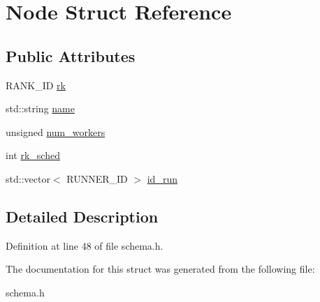 \hypertarget{structNode}{
\section{Node Struct Reference}
\label{structNode}
}
\subsection*{Public Attributes}
\begin{CompactItemize}
\item 
\hypertarget{structNode_7de6f254b6b8c3f9f8287af0bb742e9b}{
RANK\_\-ID \hyperlink{structNode_7de6f254b6b8c3f9f8287af0bb742e9b}{rk}}
\label{structNode_7de6f254b6b8c3f9f8287af0bb742e9b}

\item 
\hypertarget{structNode_3c4318d71ca9a44fe33edcf8b7f26863}{
std::string \hyperlink{structNode_3c4318d71ca9a44fe33edcf8b7f26863}{name}}
\label{structNode_3c4318d71ca9a44fe33edcf8b7f26863}

\item 
\hypertarget{structNode_01fec86d75332858b158c810d57caee3}{
unsigned \hyperlink{structNode_01fec86d75332858b158c810d57caee3}{num\_\-workers}}
\label{structNode_01fec86d75332858b158c810d57caee3}

\item 
\hypertarget{structNode_98deed2036c3dd8fc0f4fe8dacf56a92}{
int \hyperlink{structNode_98deed2036c3dd8fc0f4fe8dacf56a92}{rk\_\-sched}}
\label{structNode_98deed2036c3dd8fc0f4fe8dacf56a92}

\item 
\hypertarget{structNode_a90013b890888d3d252a71cb4fe48934}{
std::vector$<$ RUNNER\_\-ID $>$ \hyperlink{structNode_a90013b890888d3d252a71cb4fe48934}{id\_\-run}}
\label{structNode_a90013b890888d3d252a71cb4fe48934}

\end{CompactItemize}


\subsection{Detailed Description}




Definition at line 48 of file schema.h.

The documentation for this struct was generated from the following file:\begin{CompactItemize}
\item 
schema.h\end{CompactItemize}
